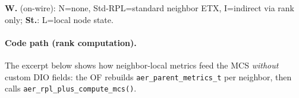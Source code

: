 \begin{aertablecol}[t]
  \caption{AER-MQoS signals vs.\ DIO/DAO carriage (\texttt{rpl-of-aer-plus.c} builds). Values are local to the node unless noted; no project-specific TLV is serialized in the evaluated firmware. W.=on-wire; St.=local state.}
  \label{tab:dio-signals}
  \begingroup\sloppy
  \setlength{\tabcolsep}{1.8pt}%
  \renewcommand{\arraystretch}{1.03}%
  \endgroup
  \vspace{0.2em}
  \raggedright
  \textbf{W.} (on-wire): N=none, Std-RPL=standard neighbor ETX, I=indirect via rank only; \textbf{St.}: L=local node state.
\end{aertablecol}

\paragraph{Code path (rank computation).}
\begingroup\sloppy
The excerpt below shows how neighbor-local metrics feed the MCS \emph{without} custom DIO fields: the OF rebuilds \texttt{aer\_parent\_metrics\_t} per neighbor, then calls \texttt{aer\_rpl\_plus\_compute\_mcs()}.
\endgroup

